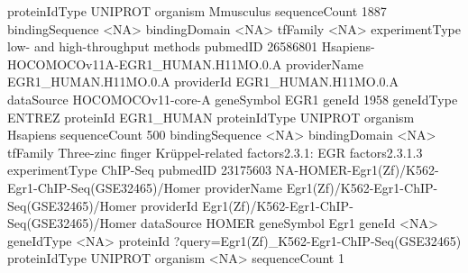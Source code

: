\documentclass{article}
\renewenvironment{Schunk}{\vspace{\topsep}}{\vspace{\topsep}}
\begin{document}
\begin{Schunk}
\begin{Soutput}
proteinIdType   UNIPROT                                 
organism        Mmusculus                               
sequenceCount   1887                                    
bindingSequence <NA>                                    
bindingDomain   <NA>                                    
tfFamily        <NA>                                    
experimentType  low- and high-throughput methods        
pubmedID        26586801                                
                Hsapiens-HOCOMOCOv11A-EGR1_HUMAN.H11MO.0.A                            
providerName    EGR1_HUMAN.H11MO.0.A                                                  
providerId      EGR1_HUMAN.H11MO.0.A                                                  
dataSource      HOCOMOCOv11-core-A                                                    
geneSymbol      EGR1                                                                  
geneId          1958                                                                  
geneIdType      ENTREZ                                                                
proteinId       EGR1_HUMAN                                                            
proteinIdType   UNIPROT                                                               
organism        Hsapiens                                                              
sequenceCount   500                                                                   
bindingSequence <NA>                                                                  
bindingDomain   <NA>                                                                  
tfFamily        Three-zinc finger Krüppel-related factors{2.3.1}: EGR factors{2.3.1.3}
experimentType  ChIP-Seq                                                              
pubmedID        23175603                                                              
                NA-HOMER-Egr1(Zf)/K562-Egr1-ChIP-Seq(GSE32465)/Homer
providerName    Egr1(Zf)/K562-Egr1-ChIP-Seq(GSE32465)/Homer         
providerId      Egr1(Zf)/K562-Egr1-ChIP-Seq(GSE32465)/Homer         
dataSource      HOMER                                               
geneSymbol      Egr1                                                
geneId          <NA>                                                
geneIdType      <NA>                                                
proteinId       ?query=Egr1(Zf)_K562-Egr1-ChIP-Seq(GSE32465)        
proteinIdType   UNIPROT                                             
organism        <NA>                                                
sequenceCount   1                                                   

\end{Soutput}
\end{Schunk}
\end{document}
